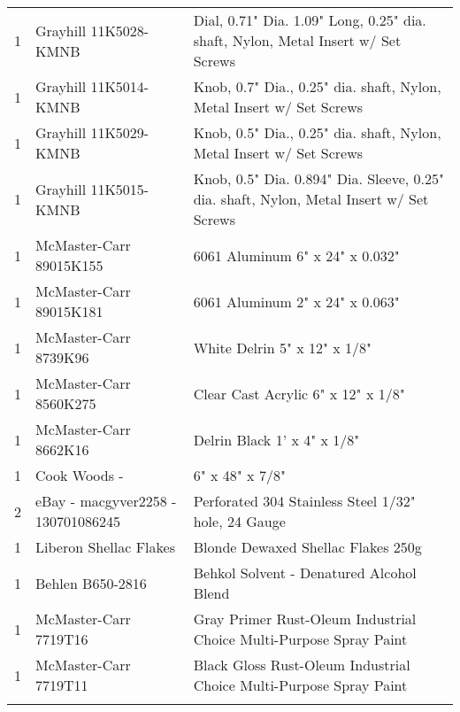 \begin{longtabu}{X[1,c,m] X[6,c,m] X[9,l,m]}
  1 & Grayhill 11K5028-KMNB & Dial, 0.71" Dia. 1.09" Long, 0.25" dia. shaft, Nylon, Metal Insert w/ Set Screws \\
  1 & Grayhill 11K5014-KMNB & Knob, 0.7" Dia., 0.25" dia. shaft, Nylon, Metal Insert w/ Set Screws \\
  1 & Grayhill 11K5029-KMNB & Knob, 0.5" Dia., 0.25" dia. shaft, Nylon, Metal Insert w/ Set Screws \\
  1 & Grayhill 11K5015-KMNB & Knob, 0.5" Dia. 0.894" Dia. Sleeve, 0.25" dia. shaft, Nylon, Metal Insert w/ Set Screws \\ \mrule

  1 & McMaster-Carr 89015K155 & 6061 Aluminum 6" x 24" x 0.032" \\
  1 & McMaster-Carr 89015K181 & 6061 Aluminum 2" x 24" x 0.063" \\
  1 & McMaster-Carr 8739K96 & White Delrin 5" x 12" x 1/8" \\
  1 & McMaster-Carr 8560K275 & Clear Cast Acrylic 6" x 12" x 1/8" \\
  1 & McMaster-Carr 8662K16 & Delrin Black 1' x 4" x 1/8" \\
  1 & Cook Woods - \wood{} & 6" x 48" x 7/8" \\
  2 & eBay - macgyver2258 - 130701086245 & Perforated 304 Stainless Steel 1/32" hole, 24 Gauge \\ \mrule

  1 & Liberon Shellac Flakes & Blonde Dewaxed Shellac Flakes 250g \\
  1 & Behlen B650-2816 & Behkol Solvent - Denatured Alcohol Blend \\
  1 & McMaster-Carr 7719T16 & Gray Primer Rust-Oleum Industrial Choice Multi-Purpose Spray Paint \\
  1 & McMaster-Carr 7719T11 & Black Gloss Rust-Oleum Industrial Choice Multi-Purpose Spray Paint \\ \mrule


\end{longtabu}
